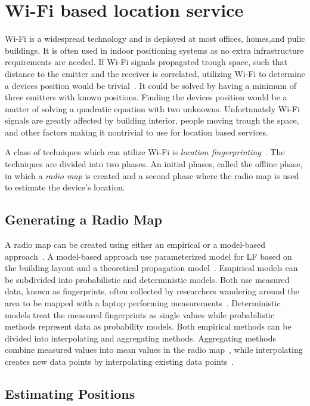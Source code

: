 
\section{Wi-Fi based location service}
Wi-Fi is a widespread technology and is deployed at most offices, homes,and pulic buildings.
It is often used in indoor positioning systems \cite{mlws,5388848,radarlf,Bell2010,6068444} as no extra infrastructure requirements are needed. 
If Wi-Fi signals propagated trough space, such that distance to the emitter and the receiver is correlated, utilizing Wi-Fi to determine a devices position would be trivial~\cite{ariadne2006}. 
It could be solved by having a minimum of three emitters with known positions. 
Finding the devices position would be a matter of solving a quadratic equation with two unknowns.   
Unfortunately Wi-Fi signals are greatly affected by building interior, people moving trough the space, and other factors making it nontrivial to use for location based services. 

A class of techniques which can utilize Wi-Fi is \textit{location fingerprinting}~\cite{taxonomy2006}. 
The techniques are divided into two phases. 
An initial phases, called the offline phase, in which a \textit{radio map} is created and a second phase where the radio map is used to estimate the device's location. 

\subsection{Generating a Radio Map}
A radio map can be created using either an empirical or a model-based approach~\cite{taxonomy2008}. 
A model-based approach use parameterized model for LF based on the building layout and a theoretical propagation model~\cite{radarlf}.   
Empirical models can be subdivided into probabilistic and deterministic models.  
Both use measured data, known as fingerprints, often collected by researchers wandering around the area to be mapped with a laptop performing measurements~\cite{roblocal2004,5388848, radarlf}.  
Deterministic models treat the measured fingerprints as single values while probabilistic methods represent data as probability models. 
Both empirical methods can be divided into interpolating and aggregating methods. 
Aggregating methods combine measured values into mean values in the radio map~\cite{radarlf, roblocal2004}, while interpolating creates new data points by interpolating existing data points~\cite{locadio2004}. 

\subsection{Estimating Positions}
